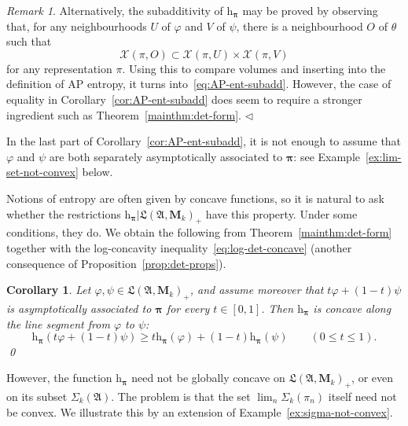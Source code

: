 \documentclass[12pt,a4paper]{article}
\numberwithin{equation}{section}
\newtheorem{cor}[thm]{Corollary}
\theoremstyle{remark}
\newtheorem{rmk}[thm]{Remark}
\newcommand{\rmM}{\mathbf{M}}
\newcommand{\rmh}{\mathrm{h}}
\newcommand{\X}{\mathcal{X}}
\newcommand{\A}{\mathfrak{A}}
\newcommand{\frL}{\mathfrak{L}}
\renewcommand{\S}{\Sigma}
\renewcommand{\phi}{\varphi}
\newcommand{\fin}{\nolinebreak\hspace{\stretch{1}}$\lhd$}
\newcommand{\bspi}{\boldsymbol{\pi}}
\begin{document}
\begin{rmk}
Alternatively, the subadditivity of $\rmh_{\bspi}$ may be proved by observing that, for any neighbourhoods $U$ of $\phi$ and $V$ of $\psi$, there is a neighbourhood $O$ of $\theta$ such that
\[\X(\pi,O)\subset \X(\pi,U)\times \X(\pi,V)\]
for any representation $\pi$.  Using this to compare volumes and inserting into the definition of AP entropy, it turns into~\eqref{eq:AP-ent-subadd}.  However, the case of equality in Corollary~\ref{cor:AP-ent-subadd} does seem to require a stronger ingredient such as Theorem~\ref{mainthm:det-form}. \fin
\end{rmk}

In the last part of Corollary~\ref{cor:AP-ent-subadd}, it is not enough to assume that $\phi$ and $\psi$ are both separately asymptotically associated to $\bspi$: see Example~\ref{ex:lim-set-not-convex} below.

Notions of entropy are often given by concave functions, so it is natural to ask whether the restrictions $\rmh_{\bspi}|\frL(\A,\rmM_k)_+$ have this property.  Under some conditions, they do.  We obtain the following from Theorem~\ref{mainthm:det-form} together with the log-concavity inequality~\eqref{eq:log-det-concave} (another consequence of Proposition~\ref{prop:det-props}).

\begin{cor}
Let $\phi,\psi \in \frL(\A,\rmM_k)_+$, and assume moreover that ${t\phi + (1-t)\psi}$ is asymptotically associated to $\bspi$ for every $t \in [0,1]$.  Then $\rmh_{\bspi}$ is concave along the line segment from $\phi$ to $\psi$:
\[\rmh_{\bspi}(t\phi + (1-t)\psi) \ge t\rmh_{\bspi}(\phi) + (1-t)\rmh_{\bspi}(\psi) \qquad (0\le t \le 1).\]
\qed
\end{cor}

However, the function $\rmh_{\bspi}$ need not be globally concave on $\frL(\A,\rmM_k)_+$, or even on its subset $\S_k(\A)$.  The problem is that the set $\lim_n\S_k(\pi_n)$ itself need not be convex.  We illustrate this by an extension of Example~\ref{ex:sigma-not-convex}.
\end{document}
